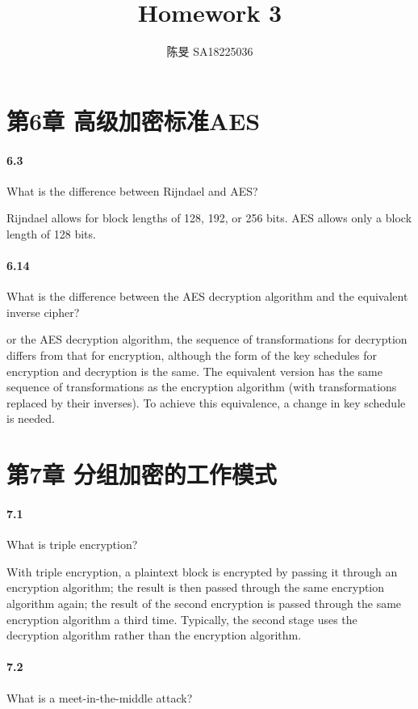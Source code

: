 \documentclass[UTF8]{article}
\title{Homework 3}
\author{陈旻 SA18225036}
\date{}
\begin{document}
\maketitle
\section{第6章 高级加密标准AES}
\paragraph{6.3}
What is the difference between Rijndael and AES?

Rijndael allows for block lengths of 128, 192, or 256 bits. AES allows only a block length of 128 bits.

\paragraph{6.14}
What is the difference between the AES decryption algorithm and the equivalent inverse cipher?

or the AES decryption algorithm, the sequence of transformations for decryption differs from that for encryption, although the form of the key schedules for encryption and decryption is the same. The equivalent version has the same sequence of transformations as the encryption algorithm (with transformations replaced by their inverses). To achieve this equivalence, a change in key schedule is needed.

\section{第7章 分组加密的工作模式}
\paragraph{7.1}
What is triple encryption?

With triple encryption, a plaintext block is encrypted by passing it through an encryption algorithm; the result is then passed through the same encryption algorithm again; the result of the second encryption is passed through the same encryption algorithm a third time. Typically, the second stage uses the decryption algorithm rather than the encryption algorithm.

\paragraph{7.2}
What is a meet-in-the-middle attack?
\end{document}
